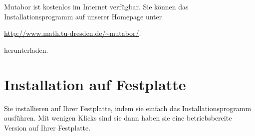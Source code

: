 
\iffalse
\section{Installation auf Diskette}\label{sec:inst-auf-disk}

Zur Installation auf Diskette fertigen Sie einfach eine Kopie der
Originaldiskette an. Zusätzlich müssen Sie einen Text-Editor auf die
Arbeitsdiskette kopieren, falls Sie eigene Logikprogramme schreiben
wollen. Sie können gegebenenfalls auch den von uns als Geschenk
beigefügten Public-Domain-Editor verwenden. Falls Sie nur fertige
Logikprogramme laufen lassen wollen, ist der Text-Editor nicht nötig.
Sie können aber auch jeden anderen Text-Editor verwenden. Achten Sie
dabei darauf, dass der Editor \textbf{keine}
Steuerzeichen\index{Steuerzeichen!keine} oder Formatierungen in die
Programmdatei schreibt, der von Ihnen erstellte Quelltext also aus
reinen ASCII-Zeichen besteht.

\section{Installation auf Festplatte}\label{sec:inst-auf-festpl}

Zur Installation auf Festplatte legen Sie einen eigenen Ordner
an, der z.\,B. \filename{MUTABOR.II} heißen kann. Kopieren Sie den
Inhalt der Originaldiskette in diesen Ordner. Ferner sollte
auf Ihrem Computer ein Text-Editor vorhanden sein. Für den
Text-Editor gilt sinngemäß dasselbe wie bei der Installation
auf Diskette.
\fi

Mutabor ist kostenlos im Internet verfügbar. Sie können das
Installationsprogramm auf unserer Homepage unter
\begin{center}
{\url{http://www.math.tu-dresden.de/~mutabor/}}.
\end{center}
herunterladen.

\section{Installation auf Festplatte}\label{sec:inst-auf-festpl-1}

Sie installieren \mutabor{} auf Ihrer Festplatte, indem sie einfach das
Installationsprogramm ausführen. Mit wenigen Klicks sind sie dann
haben sie eine betriebsbereite Version auf Ihrer Festplatte. 

